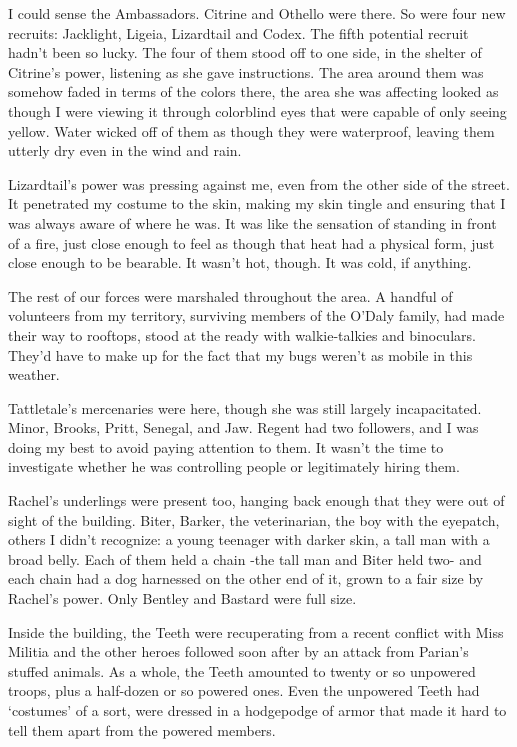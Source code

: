I could sense the Ambassadors.  Citrine and Othello were there.  So were four new recruits: Jacklight, Ligeia, Lizardtail and Codex.  The fifth potential recruit hadn't been so lucky.  The four of them stood off to one side, in the shelter of Citrine's power, listening as she gave instructions.  The area around them was somehow faded in terms of the colors there, the area she was affecting looked as though I were viewing it through colorblind eyes that were capable of only seeing yellow.  Water wicked off of them as though they were waterproof, leaving them utterly dry even in the wind and rain.



Lizardtail's power was pressing against me, even from the other side of the street.  It penetrated my costume to the skin, making my skin tingle and ensuring that I was always aware of where he was.  It was like the sensation of standing in front of a fire, just close enough to feel as though that heat had a physical form, just close enough to be bearable.  It wasn't hot, though.  It was cold, if anything.



The rest of our forces were marshaled throughout the area.  A handful of volunteers from my territory, surviving members of the O'Daly family, had made their way to rooftops, stood at the ready with walkie-talkies and binoculars.  They'd have to make up for the fact that my bugs weren't as mobile in this weather.



Tattletale's mercenaries were here, though she was still largely incapacitated.  Minor, Brooks, Pritt, Senegal, and Jaw.  Regent had two followers, and I was doing my best to avoid paying attention to them.  It wasn't the time to investigate whether he was controlling people or legitimately hiring them.



Rachel's underlings were present too, hanging back enough that they were out of sight of the building.  Biter, Barker, the veterinarian, the boy with the eyepatch, others I didn't recognize: a young teenager with darker skin, a tall man with a broad belly.  Each of them held a chain -the tall man and Biter held two- and each chain had a dog harnessed on the other end of it, grown to a fair size by Rachel's power.  Only Bentley and Bastard were full size.



Inside the building, the Teeth were recuperating from a recent conflict with Miss Militia and the other heroes followed soon after by an attack from Parian's stuffed animals. As a whole, the Teeth amounted to twenty or so unpowered troops, plus a half-dozen or so powered ones.  Even the unpowered Teeth had `costumes' of a sort, were dressed in a hodgepodge of armor that made it hard to tell them apart from the powered members.



